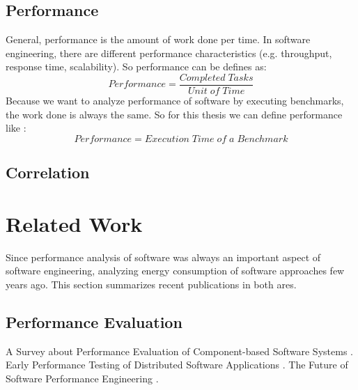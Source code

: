 \subsection{Performance}
\label{background_perf}

General, performance is the amount of work done per time\cite{tsirogiannis2010analyzing}. In software engineering, there are different performance characteristics (e.g. throughput, response time, scalability). So performance can be defines as:
\begin{equation}
\label{def:perf1}
	Performance=\frac{Completed\;Tasks}{Unit\;of\;Time}
\end{equation}
Because we want to analyze performance of software by executing benchmarks, the work done is always the same. So for this thesis we can define performance like \cite{siegmundperformance}:
\begin{equation}
\label{def:perf2}
	Performance=Execution\;Time\;of\;a\;Benchmark
\end{equation}

\subsection{Correlation}
\label{background_corr}


\section{Related Work}
\label{rel_work}

Since performance analysis of software was always an important aspect of software engineering, analyzing energy consumption of software approaches few years ago. This section summarizes recent publications in both ares. 

\subsection{Performance Evaluation}
\label{rel_perf}

A Survey about Performance Evaluation of Component-based Software Systems \cite{koziolek2010performance}.
Early Performance Testing of Distributed Software Applications \cite{denaro2004early}.
The Future of Software Performance Engineering \cite{woodside2007future}.

